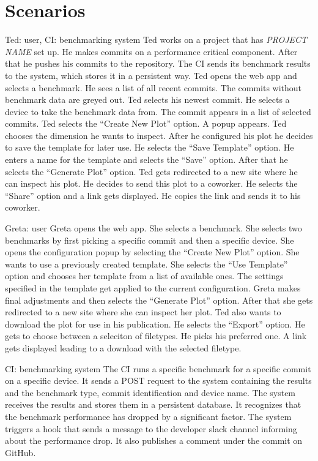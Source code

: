 \section{Scenarios}

{Ted: \Gls{user}, CI: \Gls{benchmarking system}}
{Ted works on a project that has \emph{PROJECT NAME} set up. He makes commits on a performance critical component. After that he pushes his commits to the repository. The CI sends its benchmark results to the system, which stores it in a persistent way. Ted opens the web app and selects a benchmark. He sees a list of all recent commits. The commits without benchmark data are greyed out. Ted selects his newest commit. He selects a device to take the benchmark data from. The commit appears in a list of selected commits. Ted selects the \enquote{Create New Plot} option. A popup appears. Ted chooses the dimension he wants to inspect. After he configured his plot he decides to save the \gls{template} for later use. He selects the \enquote{Save Template} option. He enters a name for the \gls{template} and selects the \enquote{Save} option. After that he selects the \enquote{Generate Plot} option. Ted gets redirected to a new site where he can inspect his plot. He decides to send this plot to a coworker. He selects the \enquote{Share} option and a link gets displayed. He copies the link and sends it to his coworker.}

{Greta: \Gls{user}}
{Greta opens the web app. She selects a benchmark. She selects two benchmarks by first picking a specific commit and then a specific device. She opens the configuration popup by selecting the \enquote{Create New Plot} option. She wants to use a previously created \gls{template}. She selects the \enquote{Use Template} option and chooses her \gls{template} from a list of available ones. The settings specified in the \gls{template} get applied to the current \gls{configuration}. Greta makes final adjustments and then selects the \enquote{Generate Plot} option. After that she gets redirected to a new site where she can inspect her plot. Ted also wants to download the plot for use in his publication. He selects the \enquote{Export} option. He gets to choose between a seleciton of filetypes. He picks his preferred one. A link gets displayed leading to a download with the selected filetype.}

{CI: \Gls{benchmarking system}}
{The CI runs a specific benchmark for a specific commit on a specific device. It sends a POST request to the system containing the results and the benchmark type, commit identification and device name. The system receives the results and stores them in a persistent database. It recognizes that the benchmark performance has dropped by a significant factor. The system triggers a hook that sends a message to the developer slack channel informing about the performance drop. It also publishes a comment under the commit on GitHub.}

